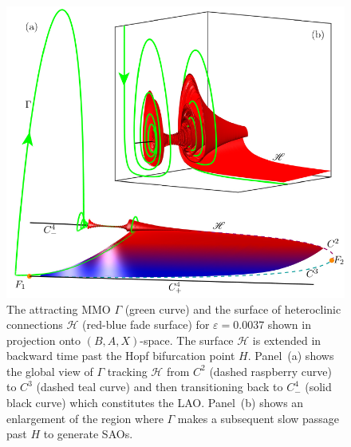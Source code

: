 \documentclass{ws-ijbc}
\begin{document}
\begin{figure}[t!]
\centering
\includegraphics[]{./figures/MKMO_14.pdf}
\caption{The attracting MMO $\Gamma$ (green curve) and the surface of heteroclinic connections $\mathscr{H}$ (red-blue fade surface) for $\varepsilon=0.0037$ shown in projection onto $(B,A,X)$-space. The surface $\mathscr{H}$ is extended in backward time past the Hopf bifurcation point $H$.  Panel~(a) shows the global view of $\Gamma$ tracking $\mathscr{H}$ from $C^2$ (dashed raspberry curve) to $C^3$ (dashed teal curve) and then transitioning back to $C^4_-$ (solid black curve) which constitutes the LAO.  Panel~(b) shows an enlargement of the region where $\Gamma$ makes a subsequent slow passage past $H$ to generate SAOs.}
\label{figure_14}
\end{figure}
\end{document}
